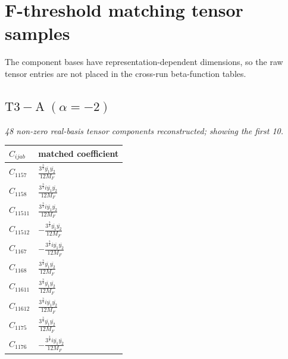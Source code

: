 \documentclass[9pt]{article}
\begin{document}
\section*{F-threshold matching tensor samples}
The component bases have representation-dependent dimensions, so the raw tensor entries are not placed in the cross-run beta-function tables.
\subsection*{$ \mathrm{T3-A}\;(\alpha=-2) $}
\textit{48 non-zero real-basis tensor components reconstructed; showing the first 10.}
\begin{longtable}{@{}ll@{}}
\toprule
$C_{ijab}$ & matched coefficient \\
\midrule
$C_{1157}$ & $ \frac{3^{\frac{3}{4}} \overline{y_{1}} \overline{y_{2}}}{12 M_F} $ \\
$C_{1158}$ & $ \frac{3^{\frac{3}{4}} i \overline{y_{1}} \overline{y_{2}}}{12 M_F} $ \\
$C_{11511}$ & $ \frac{3^{\frac{3}{4}} i \overline{y_{1}} \overline{y_{2}}}{12 M_F} $ \\
$C_{11512}$ & $ - \frac{3^{\frac{3}{4}} \overline{y_{1}} \overline{y_{2}}}{12 M_F} $ \\
$C_{1167}$ & $ - \frac{3^{\frac{3}{4}} i \overline{y_{1}} \overline{y_{2}}}{12 M_F} $ \\
$C_{1168}$ & $ \frac{3^{\frac{3}{4}} \overline{y_{1}} \overline{y_{2}}}{12 M_F} $ \\
$C_{11611}$ & $ \frac{3^{\frac{3}{4}} \overline{y_{1}} \overline{y_{2}}}{12 M_F} $ \\
$C_{11612}$ & $ \frac{3^{\frac{3}{4}} i \overline{y_{1}} \overline{y_{2}}}{12 M_F} $ \\
$C_{1175}$ & $ \frac{3^{\frac{3}{4}} \overline{y_{1}} \overline{y_{2}}}{12 M_F} $ \\
$C_{1176}$ & $ - \frac{3^{\frac{3}{4}} i \overline{y_{1}} \overline{y_{2}}}{12 M_F} $ \\
\bottomrule
\end{longtable}
\end{document}
